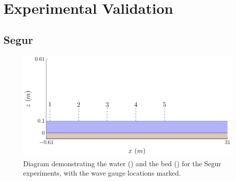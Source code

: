 
\chapter{Experimental Validation}
\label{chp:ExpMethodComp}


\section{Segur}
\begin{figure}
	\centering
	\includegraphics[width=\textwidth]{./chp6/figures/Experiment/Segur/WaveTank.pdf}
	\caption{Diagram demonstrating the water () and the bed () for the Segur experiments, with the wave gauge locations marked.}
	\label{fig:SegurWT}
\end{figure}

